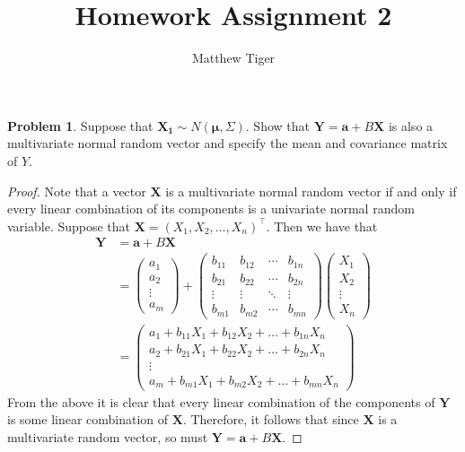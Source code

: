 \documentclass[12pt]{article}
\title{Homework Assignment 2}
\author{Matthew Tiger}
\theoremstyle{definition}
\newtheorem{problem}{Problem}
\newcommand{\vect}[1]{\boldsymbol{#1}}
\begin{document}
\maketitle


\begin{problem}
  Suppose that $\vect{X_1} \sim N(\vect{\mu}, \Sigma)$. Show that $\vect{Y} = \vect{a} + B\vect{X}$
  is also a multivariate normal random vector and specify the mean and covariance
  matrix of $Y$.
\end{problem}

\begin{proof}
  Note that a vector $\vect{X}$ is a multivariate normal random vector if
  and only if every linear combination of its
  components is a univariate normal random variable. Suppose that $\vect{X} = (X_1, X_2, \dots, X_n)^\intercal$.
  Then we have that
  \begin{align*}
    \vect{Y}
    &= \vect{a} + B\vect{X} \\
    &= \begin{pmatrix} a_1 \\ a_2 \\ \vdots \\ a_m \end{pmatrix} + \begin{pmatrix} b_{11} & b_{12} & \cdots & b_{1n} \\ b_{21} & b_{22} & \cdots & b_{2n} \\ \vdots & \vdots & \ddots & \vdots \\ b_{m1} & b_{m2} & \cdots & b_{mn} \end{pmatrix}\begin{pmatrix} X_1 \\ X_2 \\ \vdots \\ X_n \end{pmatrix} \\
    &= \begin{pmatrix} a_1 + b_{11}X_1 + b_{12}X_2 + \dots + b_{1n}X_n \\ a_2 + b_{21}X_1 + b_{22}X_2 + \dots + b_{2n}X_n \\ \vdots \\ a_m + b_{m1}X_1 + b_{m2}X_2 + \dots + b_{mn}X_n \end{pmatrix}
  \end{align*}
  From the above it is clear that every linear combination of the components of $\vect{Y}$ is some linear combination
  of $\vect{X}$. Therefore, it follows that since
  $\vect{X}$ is a multivariate random vector, so must $\vect{Y} = \vect{a} + B\vect{X}$.


\end{proof}
\end{document}
